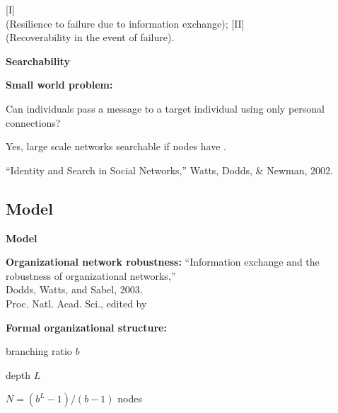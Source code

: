       [I]
        \\
        (Resilience to failure due to information exchange);
      [II] 
        \\
        (Recoverability in the event of failure).
      
    
  



  \textbf{Searchability}

  \textbf{Small world problem:}
    
    
      Can individuals pass a message
      to a target individual using only personal connections?
    
      Yes, large scale networks searchable 
      if nodes have .
    
      ``Identity and Search in Social Networks,''
      Watts, Dodds, \& Newman, 2002.\cite{watts2002b}
    
  




\subsection{Model}

  \textbf{Model}

  \textbf{Organizational network robustness:}
    ``Information exchange and the robustness of organizational networks,''\\
    Dodds, Watts, and Sabel, 2003.\cite{dodds2003c}\\
    Proc. Natl. Acad. Sci., edited by 
  

  \textbf{Formal organizational structure:}
    
    
      
      
        branching ratio $b$
      
        depth $L$
      
        $N = (b^L-1)/(b-1)$ nodes
      
